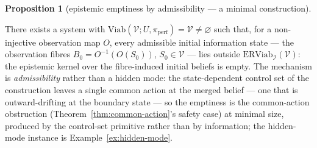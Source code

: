 \documentclass[11pt]{article}
\theoremstyle{definition}
\newtheorem{proposition}{Proposition}
\begin{document}
\begin{proposition}[epistemic emptiness by admissibility --- a minimal construction]\label{prop:emptiness}

There exists a system with
\(\mathrm{Viab}(\mathcal{V}; U, \pi_{\mathrm{perf}}) = \mathcal{V} \neq \varnothing\)
such that, for a non-injective observation map \(O\), every admissible
initial information state --- the observation fibres
\(B_0 = O^{-1}(O(S_0))\), \(S_0 \in \mathcal{V}\) --- lies outside
\(\mathrm{ERViab}_{\mathcal{I}}(\mathcal{V})\): the epistemic kernel
over the fibre-induced initial beliefs is empty. The mechanism is \emph{admissibility} rather than a hidden mode: the
state-dependent control set of the construction leaves a single common
action at the merged belief --- one that is outward-drifting at the
boundary state --- so the emptiness is the common-action obstruction
(Theorem~\ref{thm:common-action}'s safety case) at minimal size, produced by the control-set primitive rather than by information; the
hidden-mode instance is Example~\ref{ex:hidden-mode}.

\end{proposition}
\end{document}
